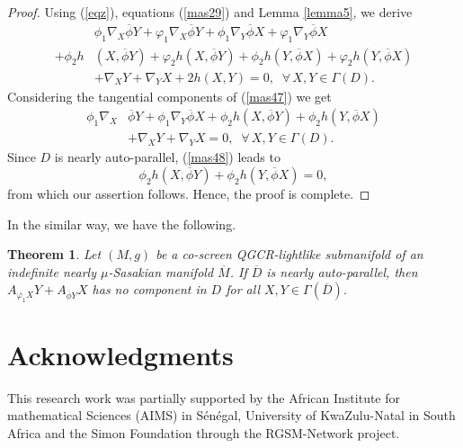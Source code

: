 \documentclass[reqno, 12pt]{amsart}
\numberwithin{equation}{section}
\newtheorem{theorem}{Theorem}[section]
\begin{document}
\begin{proof}
  Using (\ref{eqz}), equations (\ref{mas29}) and Lemma \ref{lemma5}, we derive
  \begin{align}\label{mas47}
   &\phi_{1}\nabla_{X}\overline{\phi}Y+ \varphi_{1}\nabla_{X}\overline{\phi}Y+\phi_{1}\nabla_{Y}\overline{\phi}X+ \varphi_{1}\nabla_{Y}\overline{\phi}X\nonumber\\
   +\phi_{2}h&(X,\overline{\phi}Y)+\varphi_{2}h(X,\overline{\phi}Y)+\phi_{2}h(Y,\overline{\phi}X)+\varphi_{2}h(Y,\overline{\phi}X)\nonumber\\
   &+\nabla_{X}Y+\nabla_{Y}X+2h(X,Y)=0,\;\;\forall\,X,Y\in\Gamma(D).
  \end{align}
  Considering the tangential components of (\ref{mas47}) we get 
  \begin{align}\label{mas48}
   \phi_{1}\nabla_{X}&\overline{\phi}Y+\phi_{1}\nabla_{Y}\overline{\phi}X+\phi_{2}h(X,\overline{\phi}Y)+\phi_{2}h(Y,\overline{\phi}X)\nonumber\\
   &+\nabla_{X}Y+\nabla_{Y}X=0,\;\;\forall\,X,Y\in\Gamma(D). 
  \end{align}
 Since $D$ is nearly auto-parallel, (\ref{mas48}) leads to 
 \begin{equation}\nonumber
  \phi_{2}h(X,\overline{\phi}Y)+\phi_{2}h(Y,\overline{\phi}X)=0,
 \end{equation}
from which our assertion follows. Hence,  the proof is complete.
\end{proof}
In the similar way, we have the following.
\begin{theorem}
  Let $(M,g)$ be a co-screen QGCR-lightlike submanifold of an indefinite nearly $\mu$-Sasakian manifold $\overline{M}$. If  $\overline{D}$ is nearly auto-parallel, then $A_{\varphi_{1}X}Y+A_{\overline{\phi}Y}X$ has no component in $D$ for all $X,Y\in\Gamma(\overline{D})$.
\end{theorem} 
\section*{Acknowledgments}
This research work was partially supported by the African Institute for mathematical Sciences (AIMS) in S\'en\'egal, University of KwaZulu-Natal in South Africa and the Simon Foundation through the RGSM-Network project.
\end{document}
